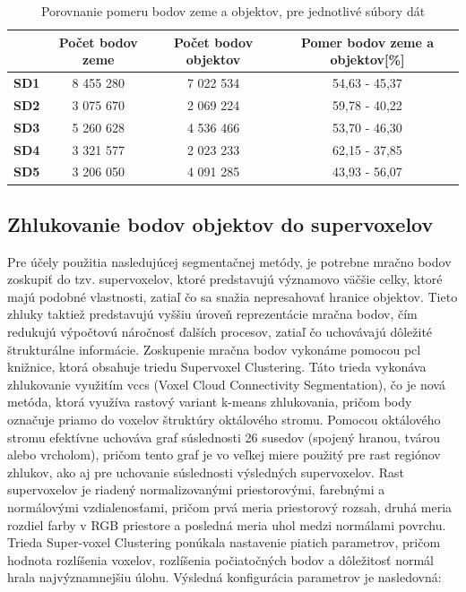 \begin{table}
    \begin{center}
        \begin{tabular}{|c || c | c | c|} 
         \hline
          & \textbf{Počet bodov zeme} & \textbf{Počet bodov objektov} & \textbf{Pomer bodov zeme a objektov[\%]} \\ [0.5ex] 
         \hline\hline
         \textbf{SD1} & 8 455 280 & 7 022 534 & 54,63 - 45,37 \\ 
         \hline
         \textbf{SD2} & 3 075 670 & 2 069 224 & 59,78 - 40,22 \\
         \hline
         \textbf{SD3} &  5 260 628 & 4 536 466 & 53,70 - 46,30 \\
         \hline
         \textbf{SD4} & 3 321 577 & 2 023 233 & 62,15 - 37,85 \\
         \hline
         \textbf{SD5} & 3 206 050 & 4 091 285 & 43,93 - 56,07 \\ 
         \hline
        \end{tabular}
    \caption{Porovnanie pomeru bodov zeme a objektov, pre jednotlivé súbory dát}
    \label{table::ground_separation}
    \end{center}
\end{table}

\subsection{Zhlukovanie bodov objektov do supervoxelov}
\noindent Pre účely použitia nasledujúcej segmentačnej metódy, je potrebne mračno bodov zoskupiť do tzv. supervoxelov, ktoré predstavujú významovo väčšie celky, ktoré majú podobné vlastnosti, zatiaľ čo sa snažia nepresahovať hranice objektov. Tieto zhluky taktiež predstavujú vyššiu úroveň reprezentácie mračna bodov, čím redukujú výpočtovú náročnosť ďalších procesov, zatiaľ čo uchovávajú dôležité štrukturálne informácie. 
\newline\indent Zoskupenie mračna bodov vykonáme pomocou \acrshort{pcl} knižnice, ktorá obsahuje triedu Supervoxel Clustering. Táto trieda vykonáva zhlukovanie využitím \acrshort{vccs} (Voxel Cloud Connectivity Segmentation), čo je nová metóda, ktorá využíva rastový variant k-means zhlukovania, pričom body označuje priamo do voxelov štruktúry oktálového stromu. Pomocou oktálového stromu efektívne uchováva graf súslednosti 26 susedov (spojený hranou, tvárou alebo vrcholom), pričom tento graf je vo veľkej miere použitý pre rast regiónov zhlukov, ako aj pre uchovanie súslednosti výsledných supervoxelov. Rast supervoxelov je riadený normalizovanými priestorovými, farebnými a normálovými vzdialenosťami, pričom prvá meria priestorový rozsah, druhá meria rozdiel farby v RGB priestore a posledná meria uhol medzi normálami povrchu. \cite{supervoxelClustering}
\newline\indent Trieda Super-voxel Clustering ponúkala nastavenie piatich parametrov, pričom hodnota rozlíšenia voxelov, rozlíšenia počiatočných bodov a dôležitosť normál hrala najvýznamnejšiu úlohu. Výsledná konfigurácia parametrov je nasledovná:

